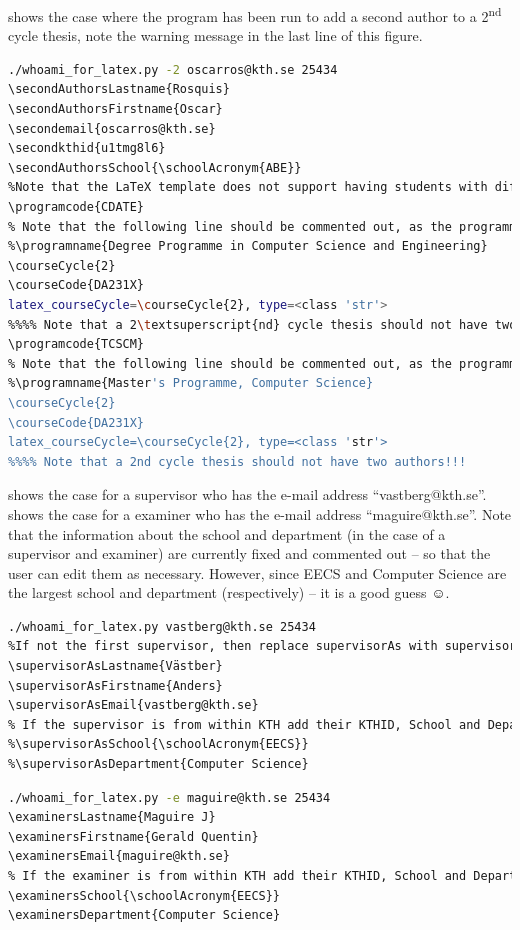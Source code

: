  shows the case where the program has been run to add a second author to a 2\textsuperscript{nd} cycle thesis, note the warning message in the last line of this figure.

\begin{lstlisting}[language={bash}, caption={Attempting to generate a 2\textsuperscript{nd} author for a 2\textsuperscript{nd} cycle thesis}, label=lst:secondAuthor]
./whoami_for_latex.py -2 oscarros@kth.se 25434
\secondAuthorsLastname{Rosquis}
\secondAuthorsFirstname{Oscar}
\secondemail{oscarros@kth.se}
\secondkthid{u1tmg8l6}
\secondAuthorsSchool{\schoolAcronym{ABE}}
%Note that the LaTeX template does not support having students with different programs or course codes
\programcode{CDATE}
% Note that the following line should be commented out, as the programme is derived from the school_and\_Programs.ins information
%\programname{Degree Programme in Computer Science and Engineering}
\courseCycle{2}
\courseCode{DA231X}
latex_courseCycle=\courseCycle{2}, type=<class 'str'>
%%%% Note that a 2\textsuperscript{nd} cycle thesis should not have two authors!!!
\programcode{TCSCM}
% Note that the following line should be commented out, as the programme is derived from the school_andPorgrams.ins information
%\programname{Master's Programme, Computer Science}
\courseCycle{2}
\courseCode{DA231X}
latex_courseCycle=\courseCycle{2}, type=<class 'str'>
%%%% Note that a 2nd cycle thesis should not have two authors!!!
\end{lstlisting}

 shows the case for a supervisor who has the e-mail address “vastberg@kth.se”.   shows the case for a examiner who has the e-mail address “maguire@kth.se”.  Note that the information about the school and department (in the case of a supervisor and examiner) are currently fixed and commented out – so that the user can edit them as necessary. However, since EECS and Computer Science are the largest school and department (respectively) – it is a good guess ☺.
\begin{lstlisting}[language={bash}, caption={Generating \LaTeX~commands for a supervisor}, label=lst:supervisor]
./whoami_for_latex.py vastberg@kth.se 25434
%If not the first supervisor, then replace supervisorAs with supervisorBs or supervisorDCAs as appropriate
\supervisorAsLastname{Västber}
\supervisorAsFirstname{Anders}
\supervisorAsEmail{vastberg@kth.se}
% If the supervisor is from within KTH add their KTHID, School and Department info
%\supervisorAsSchool{\schoolAcronym{EECS}}
%\supervisorAsDepartment{Computer Science}
\end{lstlisting}
\begin{lstlisting}[language={bash}, caption={Generating \LaTeX~commands for the examiner}, label=lst:examiner]
./whoami_for_latex.py -e maguire@kth.se 25434
\examinersLastname{Maguire J}
\examinersFirstname{Gerald Quentin}
\examinersEmail{maguire@kth.se}
% If the examiner is from within KTH add their KTHID, School and Department info
\examinersSchool{\schoolAcronym{EECS}}
\examinersDepartment{Computer Science}
\end{lstlisting}
 	
